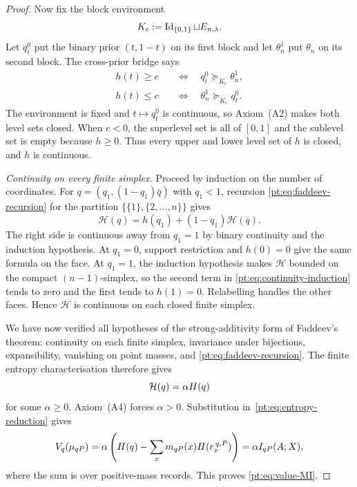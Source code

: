 \begin{proof}
Now fix the block environment
\[
 K_c:=\operatorname{Id}_{\{0,1\}}\sqcup E_{n,\lambda}.
\]
Let $q_t^0$ put the binary prior $(t,1-t)$ on its first block and let
$\theta_n^1$ put $\theta_n$ on its second block.  The cross-prior bridge says
\begin{align*}
 h(t)\ge c&\quad\Longleftrightarrow\quad q_t^0\succeq_{K_c}\theta_n^1,\\
 h(t)\le c&\quad\Longleftrightarrow\quad \theta_n^1\succeq_{K_c}q_t^0.
\end{align*}
The environment is fixed and $t\mapsto q_t^0$ is continuous, so
Axiom~\textup{(A2)} makes both level sets closed.  When $c<0$, the superlevel
set is all of $[0,1]$ and the sublevel set is empty because $h\ge0$.
Thus every upper and lower level set of $h$ is closed, and $h$ is continuous.

\emph{Continuity on every finite simplex.}
Proceed by induction on the number of coordinates.  For
$q=(q_1,(1-q_1)\bar q)$ with $q_1<1$, recursion
\eqref{pt:eq:faddeev-recursion} for the partition
$\{\{1\},\{2,\ldots,n\}\}$ gives
\begin{equation}
 \mathcal H(q)=h(q_1)+(1-q_1)\mathcal H(\bar q).
\label{pt:eq:continuity-induction}
\end{equation}
The right side is continuous away from $q_1=1$ by binary continuity and the
induction hypothesis.  At $q_1=0$, support restriction and $h(0)=0$ give
the same formula on the face.  At $q_1=1$, the induction hypothesis makes
$\mathcal H$ bounded on the compact $(n-1)$-simplex, so the second term in
\eqref{pt:eq:continuity-induction} tends to zero and the first tends to
$h(1)=0$.  Relabelling handles the other faces.  Hence $\mathcal H$ is
continuous on each closed finite simplex.

We have now verified all hypotheses of the strong-additivity form of
Faddeev's theorem: continuity on each finite simplex, invariance under
bijections, expansibility, vanishing on point masses, and
\eqref{pt:eq:faddeev-recursion}.  The finite entropy characterisation
\cite[Theorem~6]{BaezFritzLeinster2011} therefore gives
\[
 \mathcal H(q)=\alpha H(q)
\]
for some $\alpha\ge0$.  Axiom~\textup{(A4)} forces $\alpha>0$.
Substitution in~\eqref{pt:eq:entropy-reduction} gives
\[
 V_q(\mu_{qP})
 =\alpha\left(H(q)-\sum_x m_{qP}(x)
                    H(r_x^{\,q,P})\right)
 =\alpha I_{qP}(A;X),
\]
where the sum is over positive-mass records.  This proves
\eqref{pt:eq:value-MI}.
\end{proof}

